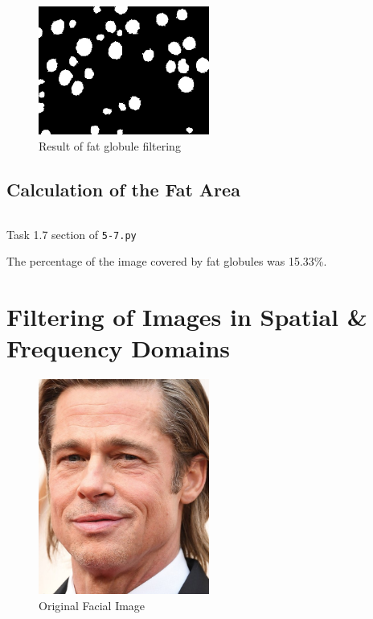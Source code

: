 \documentclass[a4paper]{article}
\newenvironment{code}{\captionsetup{type=listing}}{}
\begin{document}
\begin{figure}[H]
    \centering
    \includegraphics[width=0.5\textwidth]{../code/task1/output/filtered_fat_globules.jpg}
    \caption{Result of fat globule filtering}
\end{figure}

\subsection{Calculation of the Fat Area}
\begin{code}
\inputminted[firstline=31, lastline=40, linenos, breaklines, frame=single]{python}{../code/task1/5-7.py}
\caption{Task 1.7 section of \texttt{5-7.py}}
\end{code}

The percentage of the image covered by fat globules was 15.33\%.

\newpage


\section{Filtering of Images in Spatial \& Frequency Domains}
\begin{figure}[H]
    \centering
    \includegraphics[width=0.5\textwidth]{../Task2.jpg}
    \caption{Original Facial Image}
\end{figure}
\end{document}
